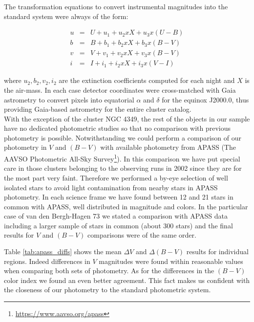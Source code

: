 \documentclass[draft]{aa}
\begin{document}
The transformation equations to convert instrumental magnitudes into the
standard system were always of the form:

\begin{eqnarray*}
    u & = & U+u_1+u_2xX+u_3x(U-B) \\
    b & = & B+b_1+b_2xX+b_3x(B-V) \\
    v & = & V+v_1+v_2xX+v_3x(B-V) \\
    i & = & I+i_1+i_2xX+i_3x(V-I)
\end{eqnarray*}

where $u_2, b_2, v_2, i_2$ are the extinction coefficients computed for each
night and $X$ is the air-mass. In each case detector coordinates were
cross-matched with Gaia astrometry to convert pixels into
equatorial $\alpha$ and $\delta$ for the equinox J2000.0, thus providing
Gaia-based astrometry for the entire cluster catalog.\\

With the exception of the cluster NGC 4349, the rest of the objects in our
sample have no dedicated photometric studies so that no comparison with previous
photometry is possible. Notwithstanding we could perform a comparison of our
photometry in $V$ and $(B-V)$ with available photometry from APASS (The AAVSO
Photometric All-Sky Survey\footnote{\url{https://www.aavso.org/apass}}).
In this comparison we have put special care in those clusters belonging to the
observing runs in 2002 since they are for the most part very faint. Therefore
we performed a by-eye selection of well isolated stars to avoid light
contamination from nearby stars in APASS photometry. In each science frame we
have found between 12 and 21 stars in common with APASS, well distributed in
magnitude and colors.
In the particular case of van den Bergh-Hagen 73 we stated a comparison with
APASS data including a larger sample of stars in common (about 300 stars) and
the final results for $V$ and $(B-V)$ comparisons were of the same order.

Table \ref{tab:apass_diffs} shows the mean $\Delta V$ and $\Delta(B-V)$ results
for individual regions. Indeed differences in $V$ magnitudes were found within
reasonable values when comparing both sets of photometry. As for the
differences in the $(B-V)$ color index we found an even better agreement. This
fact makes us confident with the closeness of our photometry to the standard
photometric system.\\
\end{document}
